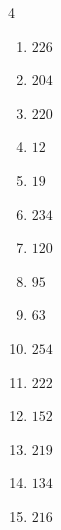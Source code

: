 \begin{multicols}{4}
\begin{enumerate}

  \item $226$


  \item $204$


  \item $220$


  \item $12$


  \item $19$


  \item $234$


  \item $120$


  \item $95$


  \item $63$


  \item $254$


  \item $222$


  \item $152$


\columnbreak %

  \item $219$


  \item $134$


  \item $216$



\end{enumerate}
\end{multicols}
